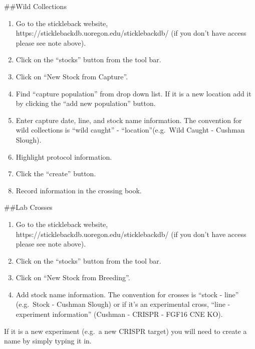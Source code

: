 \documentclass[
  letterpaper,
  DIV=11,
  numbers=noendperiod]{scrreprt}
\providecommand{\tightlist}{%
  \setlength{\itemsep}{0pt}\setlength{\parskip}{0pt}}\usepackage{longtable,booktabs,array}
\begin{document}
\#\#Wild Collections

\begin{enumerate}
\def\labelenumi{\arabic{enumi}.}
\tightlist
\item
  Go to the stickleback website,
  https://sticklebackdb.uoregon.edu/sticklebackdb/ (if you don't have
  access please see note above).
\item
  Click on the ``stocks'' button from the tool bar.
\item
  Click on ``New Stock from Capture''.
\item
  Find ``capture population'' from drop down list. If it is a new
  location add it by clicking the ``add new population'' button.
\item
  Enter capture date, line, and stock name information. The convention
  for wild collections is ``wild caught'' - ``location''(e.g.~Wild
  Caught - Cushman Slough).
\item
  Highlight protocol information.
\item
  Click the ``create'' button.
\item
  Record information in the crossing book.
\end{enumerate}

\#\#Lab Crosses

\begin{enumerate}
\def\labelenumi{\arabic{enumi}.}
\tightlist
\item
  Go to the stickleback website,
  https://sticklebackdb.uoregon.edu/sticklebackdb/ (if you don't have
  access please see note above).
\item
  Click on the ``stocks'' button from the tool bar.
\item
  Click on ``New Stock from Breeding''.
\item
  Add stock name information. The convention for crosses is ``stock -
  line'' (e.g.~Stock - Cushman Slough) or if it's an experimental cross,
  ``line - experiment information'' (Cushman - CRISPR - FGF16 CNE KO).
\end{enumerate}

\begin{tcolorbox}[enhanced jigsaw, bottomtitle=1mm, rightrule=.15mm, toptitle=1mm, opacitybacktitle=0.6, bottomrule=.15mm, titlerule=0mm, coltitle=black, leftrule=.75mm, arc=.35mm, colback=white, colframe=quarto-callout-warning-color-frame, left=2mm, colbacktitle=quarto-callout-warning-color!10!white, title=\textcolor{quarto-callout-warning-color}{\faExclamationTriangle}\hspace{0.5em}{NOTE}, toprule=.15mm, opacityback=0, breakable]

If it is a new experiment (e.g.~a new CRISPR target) you will need to
create a name by simply typing it in.

\end{tcolorbox}
\end{document}
